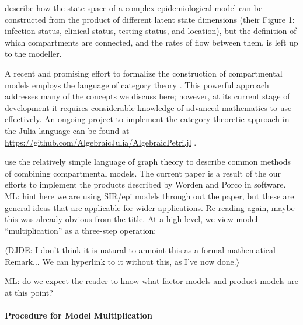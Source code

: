 \documentclass[referee,sn-basic]{sn-jnl}%
\theoremstyle{definition}
\newcommand{\mli}[1]{{\color{purple} ML: #1}}
\newcommand{\david}[1]{{\color{cyan} $\langle$DJDE: #1$\rangle$}}
\begin{document}
\cite{friston2020dynamic} describe how the state space of a complex epidemiological model can be constructed from the product of different latent state dimensions (their Figure 1: infection status, clinical status, testing status, and location), but the definition of which compartments are connected, and the rates of flow between them, is left up to the modeller.

A recent and promising effort to formalize the construction of compartmental models employs the language of category theory \citep{fong2018seven, Libkind2022an, libkind2021operadic, baez2022compositional, baez2017compositional}. This powerful approach addresses many of the concepts we discuss here; however, at its current stage of development it requires considerable knowledge of advanced mathematics to use effectively.  An ongoing project to implement the category theoretic approach in the Julia language can be found at \url{https://github.com/AlgebraicJulia/AlgebraicPetri.jl} \citep{algebraicjulia}. 

\cite{worden2017products} use the relatively simple language of graph theory to describe common methods of combining compartmental models. The current paper is a result of the our efforts to implement the products described by Worden and Porco in software. \mli{hint here we are using SIR/epi models through out the paper, but these are general ideas that are applicable for wider applications. Re-reading again, maybe this was already obvious from the title.} At a high level, we view model ``multiplication'' as a three-step operation:

\david{I don't think it is natural to annoint this as a formal mathematical Remark... We can hyperlink to it without this, as I've now done.}

\mli{do we expect the reader to know what factor models and product models are at this point?}

\paragraph{Procedure for Model Multiplication}\label{genproc}
\end{document}
